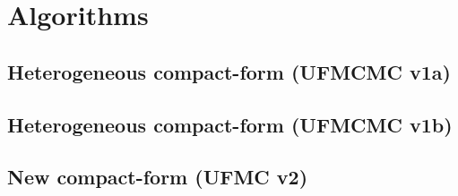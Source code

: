 \chapter{Algorithms}

\section{Heterogeneous compact-form (UFMCMC v1a)}

\section{Heterogeneous compact-form (UFMCMC v1b)}

\section{New compact-form (UFMC v2)}


